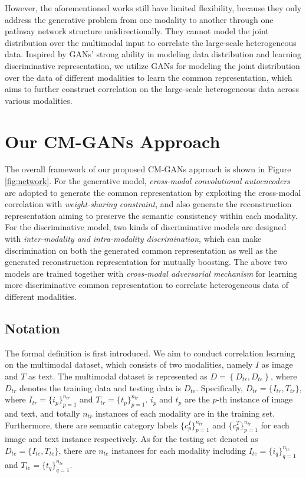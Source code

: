 \documentclass[journal]{IEEEtran}
\begin{document}
However, the aforementioned works still have limited flexibility, because they only address the generative problem from one modality to another through one pathway network structure unidirectionally. They cannot model the joint distribution over the multimodal input to correlate the large-scale heterogeneous data. Inspired by GANs' strong ability in modeling data distribution and learning discriminative representation, we utilize GANs for modeling the joint distribution over the data of different modalities to learn the common representation, which aims to further construct correlation on the large-scale heterogeneous data across various modalities.




\section{Our CM-GANs Approach}

The overall framework of our proposed CM-GANs approach is shown in Figure \ref{fig:network}. For the generative model, \textit{cross-modal convolutional autoencoders} are adopted to generate the common representation by exploiting the cross-modal correlation with \textit{weight-sharing constraint}, and also generate the reconstruction representation aiming to preserve the semantic consistency within each modality. For the discriminative model, two kinds of discriminative models are designed with \textit{inter-modality and intra-modality discrimination}, which can make discrimination on both the generated common representation as well as the generated reconstruction representation for mutually boosting. The above two models are trained together with \textit{cross-modal adversarial mechanism} for learning more discriminative common representation to correlate heterogeneous data of different modalities. 


\subsection{Notation}

The formal definition is first introduced. We aim to conduct correlation learning on the multimodal dataset, which consists of two modalities, namely $I$ as image and $T$ as text. The multimodal dataset is represented as $D=\left \{D_{tr},D_{te}\right \}$, where $D_{tr}$ denotes the training data and testing data is $D_{te}$. Specifically, $D_{tr}=\{I_{tr},T_{tr}\}$, where $I_{tr}=\{i_p\}_{p=1}^{n_{tr}}$ and $T_{tr}=\{t_p\}_{p=1}^{n_{tr}}$. $i_p$ and $t_p$ are the $p$-th instance of image and text, and totally $n_{tr}$ instances of each modality are in the training set. Furthermore, there are semantic category labels $\{c_p^I\}_{p=1}^{n_{tr}}$ and $\{c_p^T\}_{p=1}^{n_{tr}}$ for each image and text instance respectively. As for the testing set denoted as $D_{te}=\{I_{te},T_{te}\}$, there are $n_{te}$ instances for each modality including $I_{te}=\{i_q\}_{q=1}^{n_{te}}$ and $T_{te}=\{t_q\}_{q=1}^{n_{te}}$. 
\end{document}
